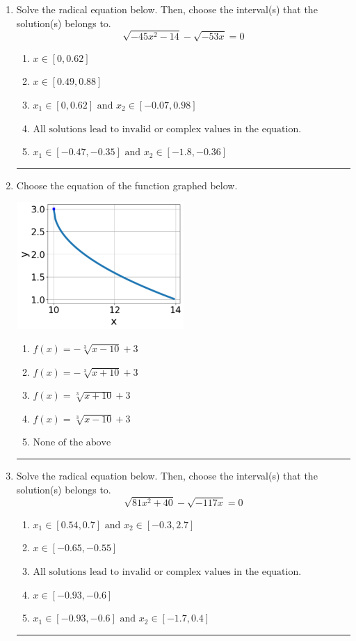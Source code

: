 \documentclass[14pt]{extbook}
\newcommand{\litem}[1]{\item#1\hspace*{-1cm}\rule{\textwidth}{0.4pt}}
\begin{document}
\begin{enumerate}
\litem{
Solve the radical equation below. Then, choose the interval(s) that the solution(s) belongs to.\[ \sqrt{-45 x^2 - 14} - \sqrt{-53 x} = 0 \]\begin{enumerate}[label=\Alph*.]
\item \( x \in [0,0.62] \)
\item \( x \in [0.49,0.88] \)
\item \( x_1 \in [0, 0.62] \text{ and } x_2 \in [-0.07,0.98] \)
\item \( \text{All solutions lead to invalid or complex values in the equation.} \)
\item \( x_1 \in [-0.47, -0.35] \text{ and } x_2 \in [-1.8,-0.36] \)

\end{enumerate} }
\litem{
Choose the equation of the function graphed below.
\begin{center}
    \includegraphics[width=0.5\textwidth]{../Figures/radicalGraphToEquationB.png}
\end{center}
\begin{enumerate}[label=\Alph*.]
\item \( f(x) = - \sqrt[3]{x - 10} + 3 \)
\item \( f(x) = - \sqrt[3]{x + 10} + 3 \)
\item \( f(x) = \sqrt[3]{x + 10} + 3 \)
\item \( f(x) = \sqrt[3]{x - 10} + 3 \)
\item \( \text{None of the above} \)

\end{enumerate} }
\litem{
Solve the radical equation below. Then, choose the interval(s) that the solution(s) belongs to.\[ \sqrt{81 x^2 + 40} - \sqrt{-117 x} = 0 \]\begin{enumerate}[label=\Alph*.]
\item \( x_1 \in [0.54, 0.7] \text{ and } x_2 \in [-0.3,2.7] \)
\item \( x \in [-0.65,-0.55] \)
\item \( \text{All solutions lead to invalid or complex values in the equation.} \)
\item \( x \in [-0.93,-0.6] \)
\item \( x_1 \in [-0.93, -0.6] \text{ and } x_2 \in [-1.7,0.4] \)


\end{enumerate}}
\end{enumerate}
\end{document}
